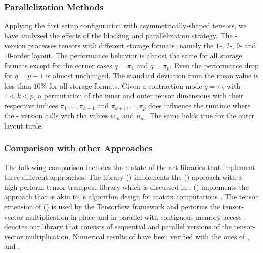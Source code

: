 \subsubsection{Parallelization Methods}



Applying the first setup configuration with asymmetrically-shaped tensors, we have analyzed the effects of the blocking and parallelization strategy.
The - version processes tensors with different storage formats, namely the $1$-, $2$-, $9$- and $10$-order layout.
The performance behavior is almost the same for all storage formats except for the corner cases $q = \pi_1$ and $q = \pi_p$.
Even the performance drop for $q = p-1$ is almost unchanged.
The standard deviation from the mean value is less than $10$\% for all storage formats.
Given a contraction mode $q = \pi_k$ with $1 < k < p$, a permutation of the inner and outer tensor dimensions with their respective indices $\pi_1, \dots,  \pi_{k-1}$ and $\pi_{k+1}, \dots, \pi_{p}$ does influence the runtime where the - version calls  with the values $w_m$ and $n_m$.
The same holds true for the outer layout tuple.



\subsubsection{Comparison with other Approaches}
The following comparison includes three state-of-the-art libraries that implement three different approaches.
The library  () implements the () approach with a high-perform tensor-transpose library  which is discussed in \cite{springer:2018:design}.
 () implements the  approach that is akin to 's algorithm design for matrix computations \cite{matthews:2018:high}.
The tensor extension of  () is used by the Tensorflow framework and performs the tensor-vector multiplication in-place and in parallel with contiguous memory access \cite{abadi:2016:tensorflow}.
 denotes our library that consists of sequential and parallel versions of the tensor-vector multiplication.
Numerical results of  have been verified with the ones of ,  and .

